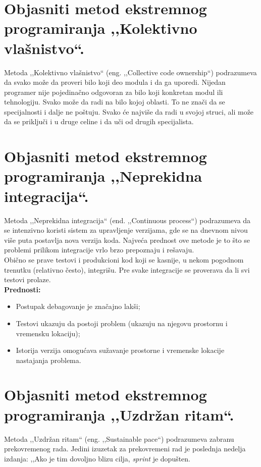 \documentclass[a4paper]{article}
\begin{document}
\section{Objasniti metod ekstremnog programiranja ,,Kolektivno vlašnistvo``.}
  Metoda ,,Kolektivno vlašnistvo`` (eng. ,,Collective code ownership``) podrazumeva
  da svako može da proveri bilo koji deo modula i da ga uporedi. Nijedan programer nije
  pojedinačno odgovoran za bilo koji konkretan modul ili tehnologiju. Svako može da 
  radi na bilo kojoj oblasti. To ne znači da se specijalnosti i dalje ne poštuju. Svako će
  najviše da radi u svojoj struci, ali može da se priključi i u druge celine i da uči od
  drugih specijalista.

\section{Objasniti metod ekstremnog programiranja ,,Neprekidna integracija``.}
  Metoda ,,Neprekidna integracija`` (end. ,,Continuous process``) podrazumeva da se intenzivno 
  koristi sistem za upravljenje verzijama, gde se na dnevnom nivou više puta postavlja nova
  verzija koda. Najveća prednost ove metode je to što se problemi prilikom integracije vrlo 
  brzo prepoznaju i rešavaju. \\
  \indent Obično se prave testovi i produkcioni kod koji se kasnije, u nekom pogodnom trenutku (relativno 
  često), integrišu. Pre svake integracije se proverava da li svi testovi prolaze. \\
  \textbf{Prednosti:}
  \begin{itemize}
    \item Postupak debagovanje je značajno lakši;
    \item Testovi ukazuju da postoji problem (ukazuju na njegovu prostornu i vremensku lokaciju);
    \item Istorija verzija omogućava sužavanje prostorne i vremenske lokacije nastajanja problema.
  \end{itemize}

\section{Objasniti metod ekstremnog programiranja ,,Uzdržan ritam``.}
  Metoda ,,Uzdržan ritam`` (eng. ,,Sustainable pace``) podrazumeva zabranu prekovremenog rada.
  Jedini izuzetak za prekovremeni rad je poslednja nedelja izdanja: ,,Ako je tim dovoljno blizu
  cilja, \textit{sprint} je dopušten. \\
\end{document}
